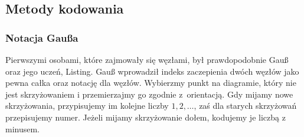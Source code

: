
\subsection{Metody kodowania}
\subsubsection{Notacja Gaußa}
Pierwszymi osobami, które zajmowały się węzłami, był prawdopodobnie Gauß oraz jego uczeń, Listing.
Gauß wprowadził indeks zaczepienia dwóch węzłów jako pewna całka oraz notację dla węzłów.
Wybierzmy punkt na diagramie, który nie jest skrzyżowaniem i przemierzajmy go zgodnie z~orientacją.
Gdy mijamy nowe skrzyżowania, przypisujemy im kolejne liczby $1, 2, \ldots$, zaś dla starych skrzyżowań przepisujemy numer.
Jeżeli mijamy skrzyżowanie dołem, kodujemy je liczbą z minusem.

